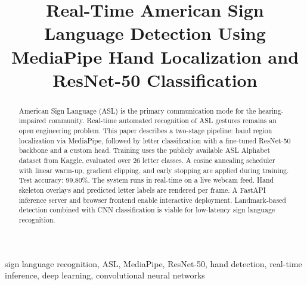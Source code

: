 \documentclass[conference]{IEEEtran}
\begin{document}
\title{Real-Time American Sign Language Detection Using MediaPipe Hand 
Localization and ResNet-50 Classification}

\author{
  \and
  \and
  \and 
  \and
}

\maketitle

\begin{abstract}
American Sign Language (ASL) is the primary communication mode for the hearing-impaired community. Real-time automated recognition of ASL gestures remains an open engineering problem. This paper describes a two-stage pipeline: hand region localization via MediaPipe, followed by letter classification with a fine-tuned ResNet-50 backbone and a custom head. Training uses the publicly available ASL Alphabet dataset from Kaggle, evaluated over 26 letter classes. A cosine annealing scheduler with linear warm-up, gradient clipping, and early stopping are applied during training. Test accuracy: 99.80\%. The system runs in real-time on a live webcam feed. Hand skeleton overlays and predicted letter labels are rendered per frame. A FastAPI inference server and browser frontend enable interactive deployment. Landmark-based detection combined with CNN classification is viable for low-latency sign language recognition.
\end{abstract}

\begin{IEEEkeywords}
sign language recognition, ASL, MediaPipe, ResNet-50, hand detection, 
real-time inference, deep learning, convolutional neural networks
\end{IEEEkeywords}
\end{document}
